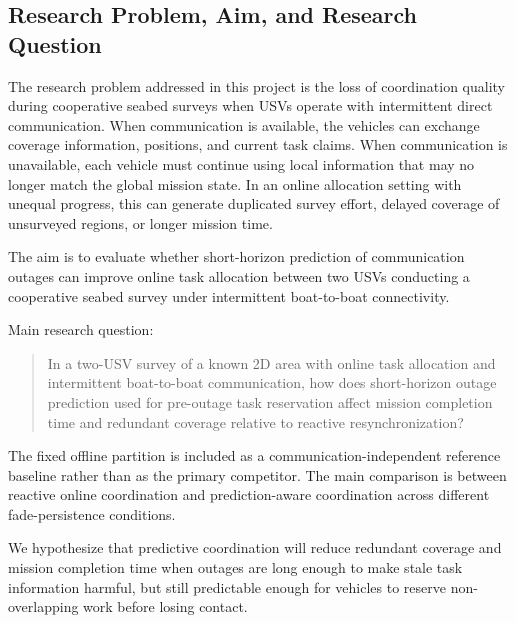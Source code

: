 \subsection{Research Problem, Aim, and Research Question}

The research problem addressed in this project is the loss of coordination quality during cooperative seabed surveys when USVs operate with intermittent direct communication. When communication is available, the vehicles can exchange coverage information, positions, and current task claims. When communication is unavailable, each vehicle must continue using local information that may no longer match the global mission state. In an online allocation setting with unequal progress, this can generate duplicated survey effort, delayed coverage of unsurveyed regions, or longer mission time.

The aim is to evaluate whether short-horizon prediction of communication outages can improve online task allocation between two USVs conducting a cooperative seabed survey under intermittent boat-to-boat connectivity.

Main research question:

\begin{quote}
In a two-USV survey of a known 2D area with online task allocation and intermittent boat-to-boat communication, how does short-horizon outage prediction used for pre-outage task reservation affect mission completion time and redundant coverage relative to reactive resynchronization?
\end{quote}

The fixed offline partition is included as a communication-independent reference baseline rather than as the primary competitor. The main comparison is between reactive online coordination and prediction-aware coordination across different fade-persistence conditions.

We hypothesize that predictive coordination will reduce redundant coverage and mission completion time when outages are long enough to make stale task information harmful, but still predictable enough for vehicles to reserve non-overlapping work before losing contact.
